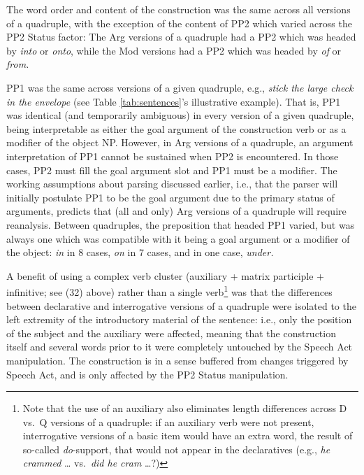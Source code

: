 \documentclass[11pt,oneside]{book}
\let\rmarkdownfootnote\footnote%
\def\footnote{\protect\rmarkdownfootnote}
\begin{document}
The word order and content of the construction was the same across all versions of a quadruple, with the exception of the content of PP2 which varied across the PP2 Status factor: The Arg versions of a quadruple had a PP2 which was headed by \emph{into} or \emph{onto}, while the Mod versions had a PP2 which was headed by \emph{of} or \emph{from.}

PP1 was the same across versions of a given quadruple, e.g., \emph{stick the large check in the envelope} (see Table \ref{tab:sentences}'s illustrative example). That is, PP1 was identical (and temporarily ambiguous) in every version of a given quadruple, being interpretable as either the goal argument of the construction verb or as a modifier of the object NP. However, in Arg versions of a quadruple, an argument interpretation of PP1 cannot be sustained when PP2 is encountered. In those cases, PP2 must fill the goal argument slot and PP1 must be a modifier. The working assumptions about parsing discussed earlier, i.e., that the parser will initially postulate PP1 to be the goal argument due to the primary status of arguments, predicts that (all and only) Arg versions of a quadruple will require reanalysis. Between quadruples, the preposition that headed PP1 varied, but was always one which was compatible with it being a goal argument or a modifier of the object: \emph{in} in 8 cases, \emph{on} in 7 cases, and in one case, \emph{under.}

A benefit of using a complex verb cluster (auxiliary + matrix participle + infinitive; see (32) above) rather than a single verb\footnote{Note that the use of an auxiliary also eliminates length differences across D vs.~Q versions of a quadruple: if an auxiliary verb were not present, interrogative versions of a basic item would have an extra word, the result of so-called \emph{do}-support, that would not appear in the declaratives (e.g., \emph{he crammed} \ldots{} vs.~\emph{did he cram} \ldots{}?)} was that the differences between declarative and interrogative versions of a quadruple were isolated to the left extremity of the introductory material of the sentence: i.e., only the position of the subject and the auxiliary were affected, meaning that the construction itself and several words prior to it were completely untouched by the Speech Act manipulation. The construction is in a sense buffered from changes triggered by Speech Act, and is only affected by the PP2 Status manipulation.
\end{document}
